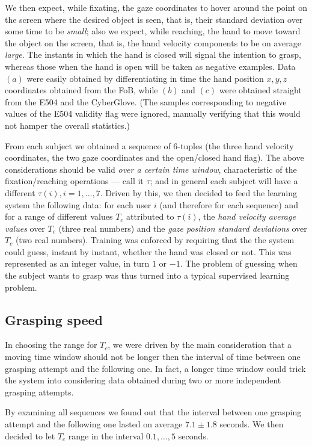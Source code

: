 We then expect, while fixating, the gaze coordinates to hover around
the point on the screen where the desired object is seen, that is,
their standard deviation over some time to be \emph{small}; also we
expect, while reaching, the hand to move toward the object on the
screen, that is, the hand velocity components to be on average
\emph{large}. The instants in which the hand is closed will signal the
intention to grasp, whereas those when the hand is open will be taken
as negative examples. Data $(a)$ were easily obtained by
differentiating in time the hand position $x,y,z$ coordinates obtained
from the FoB, while $(b)$ and $(c)$ were obtained straight from the
E504 and the CyberGlove. (The samples corresponding to negative values
of the E504 validity flag were ignored, manually verifying that this
would not hamper the overall statistics.)

From each subject we obtained a sequence of $6$-tuples (the three hand
velocity coordinates, the two gaze coordinates and the open/closed
hand flag). The above considerations should be valid \emph{over a
certain time window}, characteristic of the fixation/reaching
operations --- call it $\tau$; and in general each subject will have a
different $\tau(i), i=1,\ldots,7$. Driven by this, we then decided to
feed the learning system the following data: for each user $i$ (and
therefore for each sequence) and for a range of different values $T_c$
attributed to $\tau(i)$, the \emph{hand velocity average values} over
$T_c$ (three real numbers) and the \emph{gaze position standard
deviations} over $T_c$ (two real numbers). Training was enforced by
requiring that the the system could guess, instant by instant, whether
the hand was closed or not. This was represented as an integer value,
in turn $1$ or $-1$. The problem of guessing when the subject wants to
grasp was thus turned into a typical supervised learning problem.

\subsection{Grasping speed}

In choosing the range for $T_c$, we were driven by the main
consideration that a moving time window should not be longer then the
interval of time between one grasping attempt and the following
one. In fact, a longer time window could trick the system into
considering data obtained during two or more independent grasping
attempts.

By examining all sequences we found out that the interval between one
grasping attempt and the following one lasted on average $7.1 \pm 1.8$
seconds. We then decided to let $T_c$ range in the interval
$0.1,\ldots,5$ seconds.

